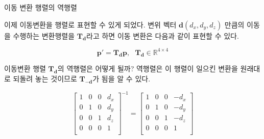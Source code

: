 \begin{frame}{이동 변환 행렬의 역행렬}

이제 이동변환을 행렬로 표현할 수 있게 되었다. 변위 벡터 $\mathbf d(d_x,d_y,d_z)$ 만큼의 이동을 수행하는 변환행렬을 $\mathbf T_{\mathbf d}$라고 하면
이동 변환은 다음과 같이 표현할 수 있다.

$$\mathbf p' = \mathbf T_{\mathbf d} \mathbf p, ~~~\mathbf T_{\mathbf d} \in \mathbb R^{4 \times 4}$$

이동변환 행렬 $\mathbf T_{\mathbf d}$의 역행렬은 어떻게 될까? 역행렬은 이 행렬이 일으킨 변환을 원래대로 되돌려 놓는 것이므로 
$\mathbf T_{- \mathbf d}$가 됨을 알 수 있다.

$$
\left [
\begin{array}{cccc}
1 & 0 & 0 & d_x \\
0 & 1 & 0 & d_y \\
0 & 0 & 1 & d_z \\
0 & 0 & 0 & 1 \\
\end{array}
\right ]^{-1}
= 
\left [
\begin{array}{cccc}
1 & 0 & 0 & -d_x \\
0 & 1 & 0 & -d_y \\
0 & 0 & 1 & -d_z \\
0 & 0 & 0 & 1 \\
\end{array}
\right ]
$$



\end{frame}



